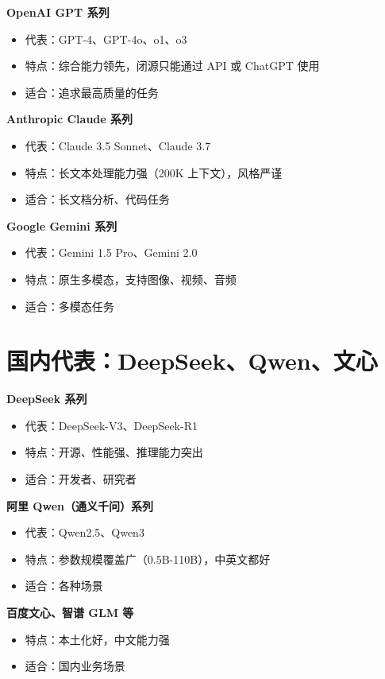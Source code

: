 \documentclass[12pt,UTF8]{ctexbook}
\begin{document}
\textbf{OpenAI GPT 系列}
\begin{itemize}
  \item 代表：GPT-4、GPT-4o、o1、o3
  \item 特点：综合能力领先，闭源只能通过 API 或 ChatGPT 使用
  \item 适合：追求最高质量的任务
\end{itemize}

\textbf{Anthropic Claude 系列}
\begin{itemize}
  \item 代表：Claude 3.5 Sonnet、Claude 3.7
  \item 特点：长文本处理能力强（200K 上下文），风格严谨
  \item 适合：长文档分析、代码任务
\end{itemize}

\textbf{Google Gemini 系列}
\begin{itemize}
  \item 代表：Gemini 1.5 Pro、Gemini 2.0
  \item 特点：原生多模态，支持图像、视频、音频
  \item 适合：多模态任务
\end{itemize}

\section{国内代表：DeepSeek、Qwen、文心}

\textbf{DeepSeek 系列}
\begin{itemize}
  \item 代表：DeepSeek-V3、DeepSeek-R1
  \item 特点：开源、性能强、推理能力突出
  \item 适合：开发者、研究者
\end{itemize}

\textbf{阿里 Qwen（通义千问）系列}
\begin{itemize}
  \item 代表：Qwen2.5、Qwen3
  \item 特点：参数规模覆盖广（0.5B-110B），中英文都好
  \item 适合：各种场景
\end{itemize}

\textbf{百度文心、智谱 GLM 等}
\begin{itemize}
  \item 特点：本土化好，中文能力强
  \item 适合：国内业务场景
\end{itemize}
\end{document}
